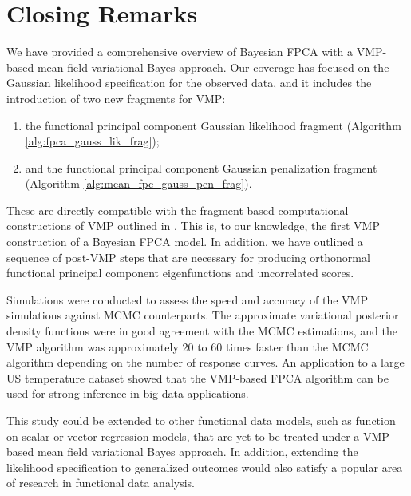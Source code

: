 \documentclass[12pt]{article}
\theoremstyle{plain}
\theoremstyle{definition}
\theoremstyle{remark}
\newif\ifblinded
\begin{document}

\section{Closing Remarks}
\label{sec:closing_remarks}

We have provided a comprehensive overview of Bayesian FPCA with a VMP-based mean field variational Bayes
approach. Our coverage has focused on the Gaussian likelihood specification for the observed data, and it
includes the introduction of two new fragments for VMP:

\begin{enumerate}
	\item the functional principal component Gaussian likelihood fragment (Algorithm \ref{alg:fpca_gauss_lik_frag});
	\item and the functional principal component Gaussian penalization fragment (Algorithm
	\ref{alg:mean_fpc_gauss_pen_frag}).
\end{enumerate}

\noindent These are directly compatible with the fragment-based computational constructions of VMP outlined in
. This is, to our knowledge, the first VMP construction of a Bayesian FPCA model. In addition,
we have outlined a sequence of post-VMP steps that are necessary for producing orthonormal functional
principal component eigenfunctions and uncorrelated scores.

Simulations were conducted to assess the speed and accuracy of the VMP simulations against MCMC
counterparts. The approximate variational  posterior density functions were in good agreement with the
MCMC estimations, and the VMP algorithm was approximately 20 to 60 times faster than the MCMC
algorithm depending on the number of response curves. An application to a large US temperature dataset
showed that the VMP-based FPCA algorithm can be used for strong inference in big data applications.

This study could be extended to other
functional data models, such as function on scalar or vector regression models, that are yet to be treated
under a VMP-based mean field variational Bayes approach. In addition, extending the likelihood specification to
generalized outcomes would also satisfy a popular area of research in functional data analysis.

\ifblinded
	
\else
	
	
\end{document}
